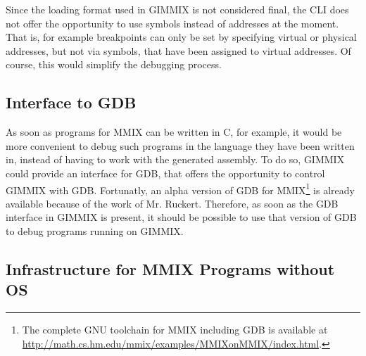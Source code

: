 Since the loading format used in GIMMIX is not considered final, the CLI does not offer the opportunity to use symbols instead of addresses at the moment. That is, for example breakpoints can only be set by specifying virtual or physical addresses, but not via symbols, that have been assigned to virtual addresses. Of course, this would simplify the debugging process.

\subsection{Interface to \protect\gls{GDB}}

As soon as programs for MMIX can be written in C, for example, it would be more convenient to debug such programs in the language they have been written in, instead of having to work with the generated assembly. To do so, GIMMIX could provide an interface for \gls{GDB}, that offers the opportunity to control GIMMIX with \gls{GDB}. Fortunatly, an alpha version of \gls{GDB} for MMIX\footnote{The complete GNU toolchain for MMIX including \gls{GDB} is available at \url{http://math.cs.hm.edu/mmix/examples/MMIXonMMIX/index.html}.} is already available because of the work of Mr. Ruckert. Therefore, as soon as the \gls{GDB} interface in GIMMIX is present, it should be possible to use that version of \gls{GDB} to debug programs running on GIMMIX.

\subsection{Infrastructure for MMIX Programs without OS}


